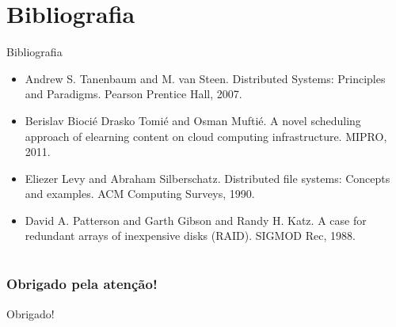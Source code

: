 
\section{Bibliografia}
\begin{frame}{Bibliografia}
	\begin{itemize}
		\item Andrew S. Tanenbaum and M. van Steen. Distributed Systems: Principles and Paradigms. Pearson Prentice Hall, 2007.
		\item Berislav Biocié Drasko Tomié and Osman Muftié. A novel scheduling approach of elearning content on cloud computing infrastructure. MIPRO, 2011.
		\item Eliezer Levy and Abraham Silberschatz. Distributed file systems: Concepts and examples. ACM Computing Surveys, 1990.
		\item David A. Patterson and Garth Gibson and Randy H. Katz. A case for redundant arrays
		of inexpensive disks (RAID). SIGMOD Rec, 1988.
	\end{itemize}
\end{frame}

\section{}
\begin{frame}
	\frametitle{Obrigado pela atenção!}
	\begin{center}
		{\Huge Obrigado!}
	\end{center}
\end{frame}
